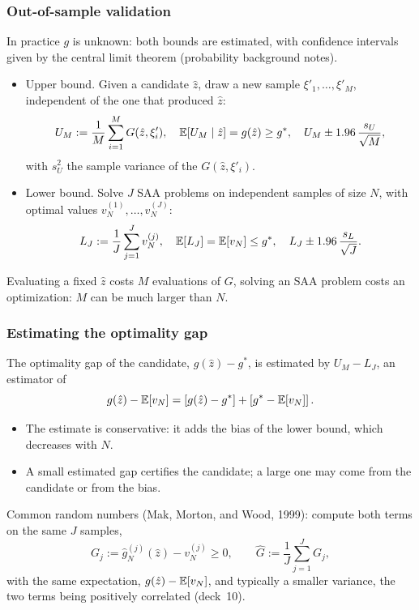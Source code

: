 \documentclass[aspectratio=169]{beamer}
\begin{document}
\begin{frame}
\frametitle{Out-of-sample validation}
\small

In practice $g$ is unknown: both bounds are {\blue estimated}, with confidence intervals given by the central limit theorem (probability background notes).

\begin{itemize}
\item
{\blue Upper bound.} Given a candidate $\hat{z}$, draw a new sample $\xi'_1, \ldots, \xi'_M$, independent of the one that produced $\hat{z}$:
\[
U_M := \frac{1}{M} \sum_{i=1}^M G(\hat{z}, \xi'_i), \quad {\mathbb{E}}[U_M \mid \hat{z}] = g(\hat{z}) \geq g^*, \quad U_M \pm 1.96\, \frac{s_U}{\sqrt{M}},
\]
with $s_U^2$ the sample variance of the $G(\hat{z}, \xi'_i)$.
\item
{\blue Lower bound.} Solve $J$ SAA problems on independent samples of size $N$, with optimal values $v_N^{(1)}, \ldots, v_N^{(J)}$:
\[
L_J := \frac{1}{J} \sum_{j=1}^J v_N^{(j)}, \quad {\mathbb{E}}[L_J] = {\mathbb{E}}[v_N] \leq g^*, \quad L_J \pm 1.96\, \frac{s_L}{\sqrt{J}}.
\]
\end{itemize}

Evaluating a fixed $\hat{z}$ costs $M$ evaluations of $G$, solving an SAA problem costs an optimization: $M$ can be much larger than $N$.

\end{frame}

\begin{frame}
\frametitle{Estimating the optimality gap}
\small

The {\blue optimality gap} of the candidate, $g(\hat{z}) - g^*$, is estimated by $U_M - L_J$, an estimator of
\[
g(\hat{z}) - {\mathbb{E}}[v_N] = \left[ g(\hat{z}) - g^* \right] + \left[ g^* - {\mathbb{E}}[v_N] \right].
\]
\begin{itemize}
\item
The estimate is {\red conservative}: it adds the bias of the lower bound, which decreases with $N$.
\item
A small estimated gap certifies the candidate; a large one may come from the candidate or from the bias.
\end{itemize}

\smallskip

{\blue Common random numbers} (Mak, Morton, and Wood, 1999): compute both terms on the same $J$ samples,
\[
G_j := \hat{g}_N^{(j)}(\hat{z}) - v_N^{(j)} \geq 0, \qquad \hat{G} := \frac{1}{J} \sum_{j=1}^J G_j,
\]
with the same expectation, $g(\hat{z}) - {\mathbb{E}}[v_N]$, and typically a smaller variance, the two terms being positively correlated (deck~10).

\end{frame}
\end{document}
